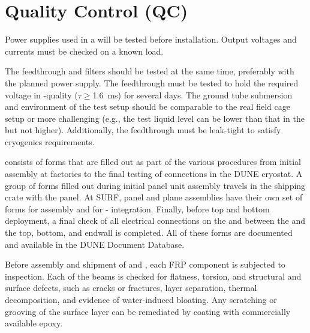 \section{Quality Control (QC)}
\label{sec:fdsp-hv-qc}

Power supplies used in a  will be tested before installation.  Output voltages and currents must be checked on a known load. 

The feedthrough and filters should be tested at the same time, preferably with the planned power supply.  The feedthrough must be tested to hold the required voltage in -quality  ($\tau\geq$\SI{1.6}{ms}) for several days.  The ground tube submersion and \efield{} environment of the test setup should be comparable to the real field cage setup or more challenging (e.g., the test liquid level can be lower than %
that in the  but not higher).  Additionally, the feedthrough must be leak-tight to satisfy cryogenics requirements.

  consists of forms that are filled out as part of the various procedures from initial assembly at factories to the final testing of connections in the DUNE cryostat.  A group of  forms filled out during initial panel unit assembly travels in the shipping crate with the panel.  At SURF,  panel and  plane assemblies have their own set of  forms for  assembly and for - integration.  Finally, before top and bottom  deployment, a final check of all electrical connections on the  and between the  and the top, bottom, and endwall  is completed.  All of these forms are documented and available in the DUNE Document Database. 

Before assembly and shipment of  and , each FRP component is subjected to inspection.
Each of the beams is checked for flatness, torsion, and structural and surface defects, such as cracks or fractures, layer separation, thermal decomposition, and evidence of water-induced bloating. Any scratching or grooving of the surface layer can be remediated by coating with commercially available epoxy.


